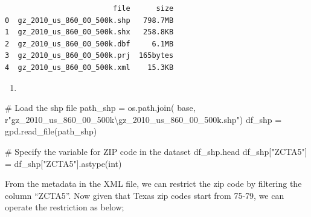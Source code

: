 \documentclass[
  letterpaper,
  DIV=11,
  numbers=noendperiod]{scrartcl}
\newenvironment{Shaded}{\begin{snugshade}}{\end{snugshade}}
\newcommand{\BuiltInTok}[1]{\textcolor[rgb]{0.00,0.23,0.31}{#1}}
\newcommand{\CommentTok}[1]{\textcolor[rgb]{0.37,0.37,0.37}{#1}}
\newcommand{\NormalTok}[1]{\textcolor[rgb]{0.00,0.23,0.31}{#1}}
\newcommand{\OperatorTok}[1]{\textcolor[rgb]{0.37,0.37,0.37}{#1}}
\newcommand{\StringTok}[1]{\textcolor[rgb]{0.13,0.47,0.30}{#1}}
\newcommand{\VerbatimStringTok}[1]{\textcolor[rgb]{0.13,0.47,0.30}{#1}}
\providecommand{\tightlist}{%
  \setlength{\itemsep}{0pt}\setlength{\parskip}{0pt}}\usepackage{longtable,booktabs,array}
\begin{document}
\begin{verbatim}
                         file      size
0  gz_2010_us_860_00_500k.shp   798.7MB
1  gz_2010_us_860_00_500k.shx   258.8KB
2  gz_2010_us_860_00_500k.dbf     6.1MB
3  gz_2010_us_860_00_500k.prj  165bytes
4  gz_2010_us_860_00_500k.xml    15.3KB
\end{verbatim}

\begin{enumerate}
\def\labelenumi{\arabic{enumi}.}
\setcounter{enumi}{1}
\tightlist
\item
\end{enumerate}

\begin{Shaded}
\begin{Highlighting}[]
\CommentTok{\# Load the shp file}
\NormalTok{path\_shp }\OperatorTok{=}\NormalTok{ os.path.join(}
\NormalTok{    base, }\VerbatimStringTok{r"gz\_2010\_us\_860\_00\_500k\textbackslash{}gz\_2010\_us\_860\_00\_500k.shp"}\NormalTok{)}
\NormalTok{df\_shp }\OperatorTok{=}\NormalTok{ gpd.read\_file(path\_shp)}
\end{Highlighting}
\end{Shaded}

\begin{Shaded}
\begin{Highlighting}[]
\CommentTok{\# Specify the variable for ZIP code in the dataset}
\NormalTok{df\_shp.head}
\NormalTok{df\_shp[}\StringTok{"ZCTA5"}\NormalTok{] }\OperatorTok{=}\NormalTok{ df\_shp[}\StringTok{"ZCTA5"}\NormalTok{].astype(}\BuiltInTok{int}\NormalTok{)}
\end{Highlighting}
\end{Shaded}

From the metadata in the XML file, we can restrict the zip code by
filtering the column ``ZCTA5''. Now given that Texas zip codes start
from 75-79, we can operate the restriction as below;
\end{document}

